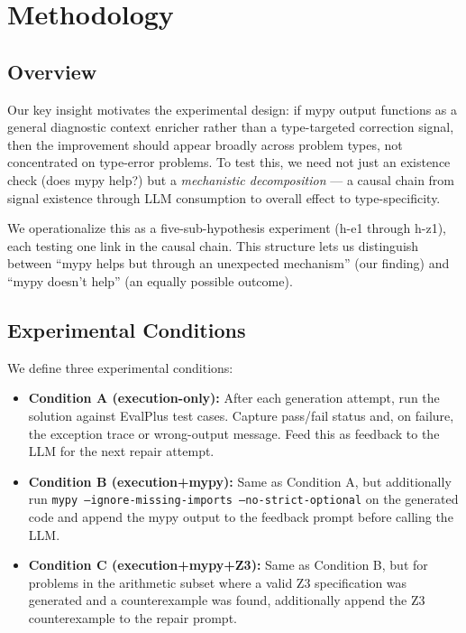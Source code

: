 \section{Methodology}

\subsection{Overview}

Our key insight motivates the experimental design: if mypy output functions as
a general diagnostic context enricher rather than a type-targeted correction
signal, then the improvement should appear broadly across problem types, not
concentrated on type-error problems. To test this, we need not just an existence
check (does mypy help?) but a \emph{mechanistic decomposition} --- a causal
chain from signal existence through LLM consumption to overall effect to
type-specificity.

We operationalize this as a five-sub-hypothesis experiment (h-e1 through h-z1),
each testing one link in the causal chain. This structure lets us distinguish
between ``mypy helps but through an unexpected mechanism'' (our finding) and
``mypy doesn't help'' (an equally possible outcome).

\subsection{Experimental Conditions}

We define three experimental conditions:

\begin{itemize}
\item \textbf{Condition A (execution-only):} After each generation attempt, run
the solution against EvalPlus test cases. Capture pass/fail status and, on
failure, the exception trace or wrong-output message. Feed this as feedback to
the LLM for the next repair attempt.

\item \textbf{Condition B (execution+mypy):} Same as Condition A, but
additionally run \texttt{mypy --ignore-missing-imports --no-strict-optional}
on the generated code and append the mypy output to the feedback prompt before
calling the LLM.

\item \textbf{Condition C (execution+mypy+Z3):} Same as Condition B, but for
problems in the arithmetic subset where a valid Z3 specification was generated
and a counterexample was found, additionally append the Z3 counterexample to
the repair prompt.
\end{itemize}

